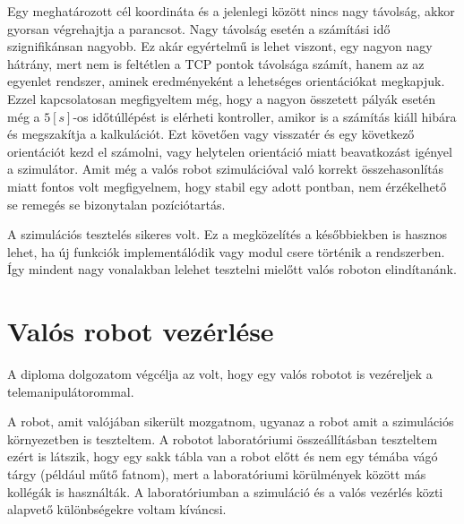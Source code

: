 Egy meghatározott cél koordináta és a jelenlegi között nincs nagy távolság, akkor gyorsan végrehajtja a parancsot. Nagy távolság esetén a számítási idő szignifikánsan nagyobb. Ez akár egyértelmű is lehet viszont, egy nagyon nagy hátrány, mert nem is feltétlen a TCP pontok távolsága számít, hanem az az egyenlet rendszer, aminek eredményeként a lehetséges orientációkat megkapjuk. Ezzel kapcsolatosan megfigyeltem még, hogy a nagyon összetett pályák esetén még a $5[s]$-os időtúllépést is elérheti kontroller, amikor is a számítás kiáll hibára és megszakítja a kalkulációt. Ezt követően vagy visszatér és egy következő orientációt kezd el számolni, vagy helytelen orientáció miatt beavatkozást igényel a szimulátor. Amit még a valós robot szimulációval való korrekt összehasonlítás miatt fontos volt megfigyelnem, hogy stabil egy adott pontban, nem érzékelhető se remegés se bizonytalan pozíciótartás.

A szimulációs tesztelés sikeres volt. Ez a megközelítés a későbbiekben is hasznos lehet, ha új funkciók implementálódik vagy modul csere történik a rendszerben. Így mindent nagy vonalakban lelehet tesztelni mielőtt valós roboton elindítanánk.


\section{Valós robot vezérlése}

A diploma dolgozatom végcélja az volt, hogy egy valós robotot is vezéreljek a telemanipulátorommal. 

A robot, amit valójában sikerült mozgatnom, ugyanaz a robot amit a szimulációs környezetben is teszteltem. A robotot laboratóriumi összeállításban teszteltem ezért is látszik, hogy egy sakk tábla van a robot előtt és nem egy témába vágó tárgy (például műtő fatnom), mert a laboratóriumi körülmények között más kollégák is használták. A laboratóriumban a szimuláció és a valós vezérlés közti alapvető különbségekre voltam kíváncsi.\citep{moveit}

